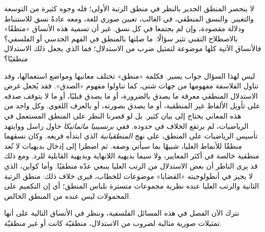 \documentclass[../../../include/open-logic-section]{subfiles}
\begin{document}


لا ينحصر المنطق الجدير بالنظر في منطق الرتبة الأولى؛ فله وجوه
كثيرة من التوسعة والتغيير. والنسق المنطقي، في الغالب، تعيين صوري
للغة، ومعه عادةً نسق للاستنباط ودلالة مقصودة، وإن لم يجتمعا في
كل نسق. غير أن تسمية هذه الأنساق «منطقًا» بالاصطلاح التقني
تثير سؤالًا: ما صلتها بالمنطق في الفهم الحدسي أو الفلسفي؟
فالأنساق الآتية كلها موضوعة لتمثيل ضرب من الاستدلال؛ فما الذي
يجعل ذلك الاستدلال منطقيًا؟

ليس لهذا السؤال جواب يسير. فكلمة «منطق» تختلف معانيها ومواضع
استعمالها، وقد تناول الفلاسفة مفهومها من جهات شتى، كما تناولوا
مفهوم «الصدق». فقد يُجعل غرض الاستدلال المنطقي معرفة ما يصدق
بالضرورة، أو ما يصدق قبليًا، أو ما لا يتوقف صدقه على تأويل
الألفاظ غير المنطقية، أو ما يصدق بصورته، أو بالعرف اللغوي.
وكل واحد من هذه المعاني يحتاج إلى بيان كثير. بل لو قصرنا النظر
على المنطق المستعمل في الرياضيات، لم يرتفع الخلاف في حدوده.
ففي \textit{برنسيبيا ماثماتيكا} حاول راسل ووايتهد تأسيس الرياضيات
على المنطق، على نهج {\em المنطقيانية} الذي ابتدأه فريغه.
وكان نسقهما منطقًا للأنماط العليا، شبيهًا بما سيأتي وصفه.
ثم اضطرا إلى إدخال بديهيات لا تُعد منطقية خالصة في أكثر المعايير،
ولا سيما بديهية اللانهاية وبديهية القابلية للرد. ومع ذلك قد يرى
الناظر أن بعض الاستدلال من الرتب العليا ينبغي عدّه منطقيًا.
وأما كواين، الذي لا يجيز في أنطولوجيته «القضايا» موضوعات للخطاب،
فيرى خلاف ذلك: منطق الرتبة الثانية والرتب العليا عنده نظرية
مجموعات متسترة بلباس المنطق؛ أي إن التكميم على المحمولات ليس
عنده من المنطق الخالص.

نترك الآن الفصل في هذه المسائل الفلسفية، وننظر في الأنساق
التالية على أنها تمثيلات صورية مثالية لضروب من الاستدلال،
منطقيّة كانت أو غير منطقيّة.
\end{document}
